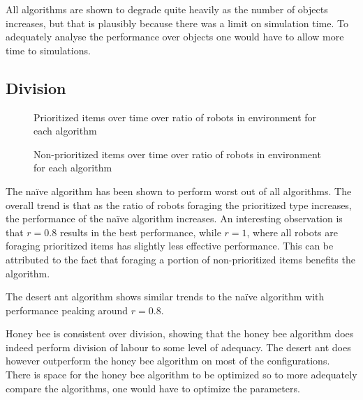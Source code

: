 All algorithms are shown to degrade quite heavily as the number of objects increases, but that is plausibly because there was a limit on simulation time. To adequately analyse the performance over objects one would have to allow more time to simulations. 

\subsection{Division}
\label{results:division}


\begin{figure}[!htb]
\centering
\resizebox{\textwidth}{!}{}
\caption{Prioritized items over time over ratio of robots in environment for each algorithm }
\label{divisiongoldplot}
\end{figure}


\begin{figure}[!htb]
\centering
\resizebox{\textwidth}{!}{}
\caption{Non-prioritized items over time over ratio of robots in environment for each algorithm}
\label{divisionwasteplot}
\end{figure}

The na\"ive algorithm has been shown to perform worst out of all algorithms. The overall trend is that as the ratio of robots foraging the prioritized type increases, the performance of the na\"ive algorithm increases. An interesting observation is that $r=0.8$ results in the best performance, while $r=1$, where all robots are foraging prioritized items has slightly less effective performance. This can be attributed to the fact that foraging a portion of non-prioritized items benefits the algorithm.       

The desert ant algorithm shows similar trends to the na\"ive algorithm with performance peaking around $r=0.8$. 

Honey bee is consistent over division, showing that the honey bee algorithm does indeed perform division of labour to some level of adequacy. The desert ant does however outperform the honey bee algorithm on most of the configurations. There is space for the honey bee algorithm to be optimized so to more adequately compare the algorithms, one would have to optimize the parameters. 

